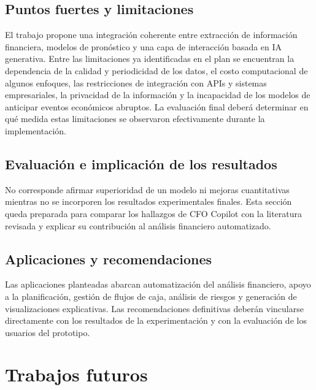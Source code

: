 \documentclass[12pt,letterpaper,oneside]{report}
\renewcommand{\_}{\UnderscoreOriginal\allowbreak}
\begin{document}
\section{Puntos fuertes y limitaciones}
El trabajo propone una integración coherente entre extracción de información financiera, modelos de pronóstico y una capa de interacción basada en IA generativa. Entre las limitaciones ya identificadas en el plan se encuentran la dependencia de la calidad y periodicidad de los datos, el costo computacional de algunos enfoques, las restricciones de integración con APIs y sistemas empresariales, la privacidad de la información y la incapacidad de los modelos de anticipar eventos económicos abruptos. La evaluación final deberá determinar en qué medida estas limitaciones se observaron efectivamente durante la implementación.

\section{Evaluación e implicación de los resultados}
No corresponde afirmar superioridad de un modelo ni mejoras cuantitativas mientras no se incorporen los resultados experimentales finales. Esta sección queda preparada para comparar los hallazgos de CFO Copilot con la literatura revisada y explicar su contribución al análisis financiero automatizado.

\section{Aplicaciones y recomendaciones}
Las aplicaciones planteadas abarcan automatización del análisis financiero, apoyo a la planificación, gestión de flujos de caja, análisis de riesgos y generación de visualizaciones explicativas. Las recomendaciones definitivas deberán vincularse directamente con los resultados de la experimentación y con la evaluación de los usuarios del prototipo.

\chapter{Trabajos futuros}
\end{document}
